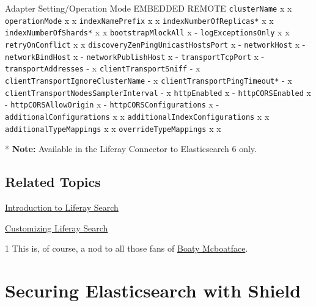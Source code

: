 Adapter Setting/Operation Mode \textbar{} EMBEDDED \textbar{} REMOTE
\textbar{} \texttt{clusterName} \textbar{} x \textbar{} x
\texttt{operationMode} \textbar{} x \textbar{} x
\texttt{indexNamePrefix} \textbar{} x \textbar{} x
\texttt{indexNumberOfReplicas*} \textbar{} x \textbar{} x
\texttt{indexNumberOfShards*} \textbar{} x \textbar{} x
\texttt{bootstrapMlockAll} \textbar{} x \textbar{} -
\texttt{logExceptionsOnly} \textbar{} x \textbar{} x
\texttt{retryOnConflict} \textbar{} x \textbar{} x
\texttt{discoveryZenPingUnicastHostsPort} \textbar{} x \textbar{} -
\texttt{networkHost} \textbar{} x \textbar{} - \texttt{networkBindHost}
\textbar{} x \textbar{} - \texttt{networkPublishHost} \textbar{} x
\textbar{} - \texttt{transportTcpPort} \textbar{} x \textbar{} -
\texttt{transportAddresses} \textbar{} - \textbar{} x
\texttt{clientTransportSniff} \textbar{} - \textbar{} x
\texttt{clientTransportIgnoreClusterName} \textbar{} - \textbar{} x
\texttt{clientTransportPingTimeout*} \textbar{} - \textbar{} x
\texttt{clientTransportNodesSamplerInterval} \textbar{} - \textbar{} x
\texttt{httpEnabled} \textbar{} x \textbar{} - \texttt{httpCORSEnabled}
\textbar{} x \textbar{} - \texttt{httpCORSAllowOrigin} \textbar{} x
\textbar{} - \texttt{httpCORSConfigurations} \textbar{} x \textbar{} -
\texttt{additionalConfigurations} \textbar{} x \textbar{} x
\texttt{additionalIndexConfigurations} \textbar{} x \textbar{} x
\texttt{additionalTypeMappings} \textbar{} x \textbar{} x
\texttt{overrideTypeMappings} \textbar{} x \textbar{} x

* \textbf{Note:} Available in the Liferay Connector to Elasticsearch 6
only.

\subsection{Related Topics}\label{related-topics-10}

\href{/docs/7-0/tutorials/-/knowledge_base/t/introduction-to-liferay-search}{Introduction
to Liferay Search}

\href{/docs/7-0/tutorials/-/knowledge_base/t/customizing-liferay-search}{Customizing
Liferay Search}

1 This is, of course, a nod to all those fans of
\href{http://www.theatlantic.com/international/archive/2016/05/boaty-mcboatface-parliament-lessons/482046}{Boaty
Mcboatface}.

\section{Securing Elasticsearch with
Shield}\label{securing-elasticsearch-with-shield}

